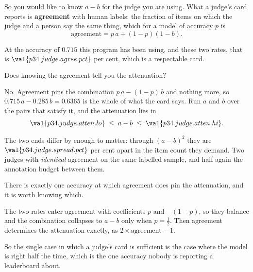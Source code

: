 \begin{fr}
So you would like to know $a - b$ for the judge you are using. What a judge's
card reports is \textbf{agreement} with human labels: the fraction of items
on which the judge and a person say the same thing, which for a model of
accuracy $p$ is
\[ \text{agreement} = p\,a + (1-p)(1-b) . \]

At the accuracy of $\num{0.715}$ this program has been using, and these two
rates, that is $\val{p34.judge.agree.pct}$ per cent, which is a respectable
card.

Does knowing the agreement tell you the attenuation?
\dotline
\nextframe
\end{fr}

\begin{fr}
\begin{ansblock}
No. Agreement pins the combination $p\,a - (1-p)\,b$ and nothing more, so
$\num{0.715}\,a - \num{0.285}\,b = \num{0.6365}$ is the whole of what the
card says. Run $a$ and $b$ over the pairs that satisfy it, and the
attenuation lies in
\[ \val{p34.judge.atten.lo} \;\le\; a - b \;\le\;
   \val{p34.judge.atten.hi} . \]
\end{ansblock}

The two ends differ by enough to matter: through
$(a-b)^{2}$ they are $\val{p34.judge.spread.pct}$ per cent apart in the item
count they demand. Two judges with \emph{identical} agreement on the same
labelled sample, and half again the annotation budget between them.
\end{fr}

\begin{fr}
\begin{trapbox}
There is exactly one accuracy at which agreement does pin the attenuation,
and it is worth knowing which.

The two rates enter agreement with coefficients $p$ and $-(1-p)$, so they
balance \dash{} and the combination collapses to $a - b$ \dash{} only when
$p = \frac{1}{2}$. Then agreement determines the attenuation exactly, as
$2\times\text{agreement} - 1$.

So the single case in which a judge's card is sufficient is the case where
the model is right half the time, which is the one accuracy nobody is
reporting a leaderboard about.
\end{trapbox}
\end{fr}

